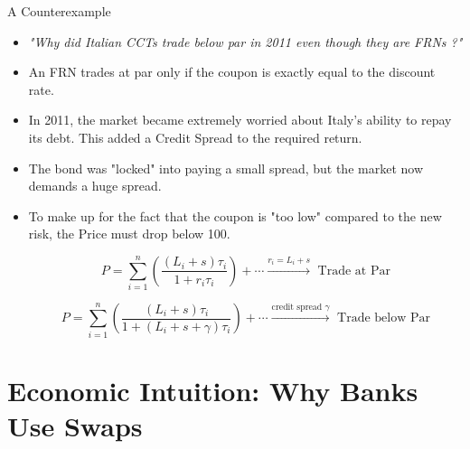 \documentclass{beamer}
\begin{document}
\begin{frame}{A Counterexample}
	\begin{itemize}
		\item<1-> \emph{"Why did Italian CCTs trade below par in 2011 even though they are FRNs ?"}
		\item<2-> An FRN trades at par only if the coupon is exactly equal to the discount rate.
		\item<2-> In 2011, the market became extremely worried about Italy's ability to repay its debt. This added a Credit Spread to the required return.
		\item<2-> The bond was "locked" into paying a small spread, but the market now demands a huge spread.
		\item<2-> To make up for the fact that the coupon is "too low" compared to the new risk, the Price must drop below 100.

\begin{equation*}
	P = \sum_{i=1}^{n}\left(\frac{(L_i+s)\tau_i}{1+r_i\tau_i}\right) + \cdots \xrightarrow{r_i = L_i+s} \text{ Trade at Par}
\end{equation*}

\begin{equation*}
	P = \sum_{i=1}^{n}\left(\frac{(L_i+s)\tau_i}{1+(L_i+s+\gamma)\tau_i}\right) + \cdots \xrightarrow{\text{credit spread $\gamma$}} \text{ Trade below Par}
\end{equation*}
%
%
%
%
%
%
%
	\end{itemize}
\end{frame}


\section{Economic Intuition: Why Banks Use Swaps}
\end{document}
